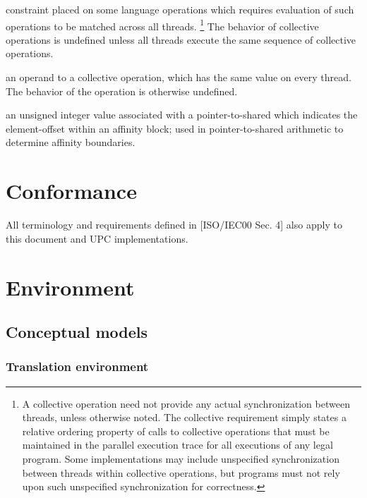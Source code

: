 %
     constraint placed on some language 
     operations which requires evaluation of such operations to be
     matched across all threads.%
     \footnote{A collective operation need not provide any
     actual synchronization between threads, unless otherwise noted.
     The collective requirement simply states a relative ordering property
     of calls to collective operations that must be maintained in the
     parallel execution trace for all executions of any legal program.
     Some implementations may include unspecified synchronization between
     threads within collective operations, but programs must not rely upon
     such unspecified synchronization for correctness.}%
     The behavior of collective operations is undefined unless all threads
     execute the same sequence of collective operations.

%
     an operand to a collective operation, which has
     the same value on every thread.  The behavior of the operation
     is otherwise undefined.

%
     an unsigned integer value associated with a
     pointer-to-shared which indicates the element-offset within an
     affinity block; used in pointer-to-shared arithmetic
     to determine affinity boundaries.


\section{Conformance}


\npf  All terminology and requirements defined in [ISO/IEC00 Sec. 4] also apply
      to this document and UPC implementations.

\pagebreak
\section{Environment}

\subsection{Conceptual models}
\subsubsection{Translation environment}

